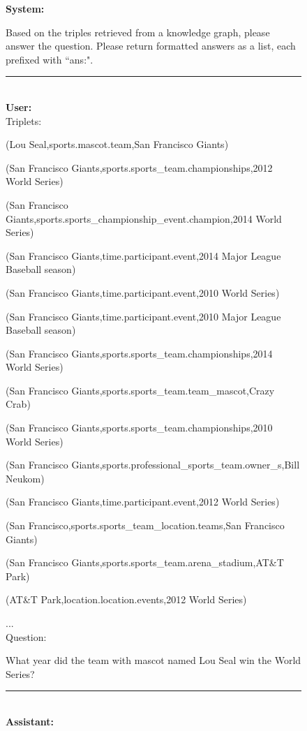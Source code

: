 \begin{figure}
\begin{tcolorbox}[colback=gray!5!white, colframe=gray!75!black, title=Input Prompts for KGQA]
\scriptsize

\textbf{System:}\\
\raggedright Based on the triples retrieved from a knowledge graph, please answer the question. Please return formatted answers as a list, each prefixed with ``ans:".
\rule{\linewidth}{0.4pt} 
\\
\textbf{User:} \; {\color{red}{// ICL example}} \\
Triplets:

(Lou Seal,sports.mascot.team,San Francisco Giants)

(San Francisco Giants,sports.sports\_team.championships,2012 World Series)

(San Francisco Giants,sports.sports\_championship\_event.champion,2014 World Series)

(San Francisco Giants,time.participant.event,2014 Major League Baseball season)

(San Francisco Giants,time.participant.event,2010 World Series)

(San Francisco Giants,time.participant.event,2010 Major League Baseball season)

(San Francisco Giants,sports.sports\_team.championships,2014 World Series)

(San Francisco Giants,sports.sports\_team.team\_mascot,Crazy Crab)

(San Francisco Giants,sports.sports\_team.championships,2010 World Series)

(San Francisco Giants,sports.professional\_sports\_team.owner\_s,Bill Neukom)

(San Francisco Giants,time.participant.event,2012 World Series)

(San Francisco,sports.sports\_team\_location.teams,San Francisco Giants)

(San Francisco Giants,sports.sports\_team.arena\_stadium,AT\&T Park)

(AT\&T Park,location.location.events,2012 World Series)

...
\vspace{1mm}
\\

Question:

What year did the team with mascot named Lou Seal win the World Series?
\\
\rule{\linewidth}{0.4pt} 
\\
\textbf{Assistant:} \; {\color{red}{// ICL example}} 


\end{tcolorbox}
\end{figure}
